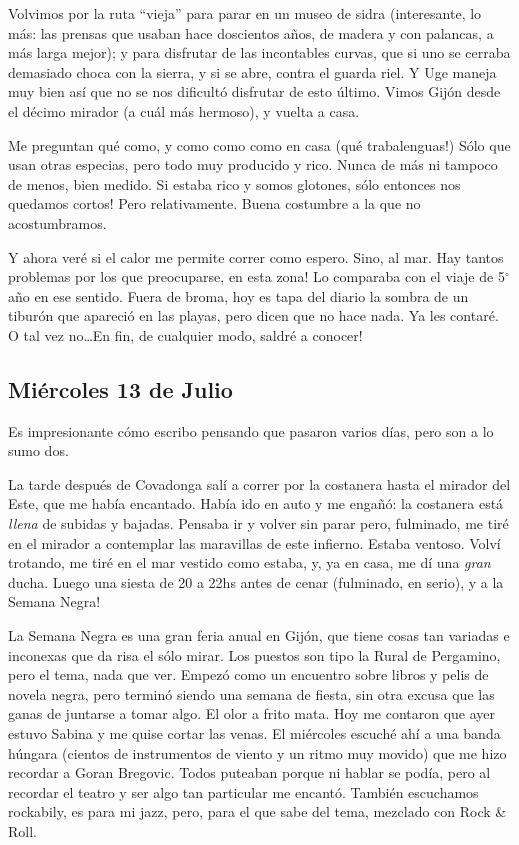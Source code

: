 Volvimos por la ruta ``vieja'' para parar en un museo de sidra (interesante,
lo m\'as: las prensas que usaban hace doscientos a\~nos, de madera y con
palancas, a m\'as larga mejor); y para disfrutar de las incontables curvas, que
si uno se cerraba demasiado choca con la sierra, y si se abre, contra el
guarda riel. Y Uge maneja muy bien as\'i que no se nos dificult\'o disfrutar
de esto \'ultimo. Vimos Gij\'on desde el d\'ecimo mirador (a cu\'al m\'as
hermoso), y vuelta a casa.

Me preguntan qu\'e como, y como como como en casa (\textexclamdown qu\'e
trabalenguas!) S\'olo que usan otras especias, pero todo muy producido y rico.
Nunca de m\'as ni tampoco de menos, bien medido. Si estaba rico y somos
glotones, \textexclamdown s\'olo entonces nos quedamos cortos! Pero
relativamente. Buena costumbre a la que no acostumbramos.

Y ahora ver\'e si el calor me permite correr como espero. Sino, al mar.
\textexclamdown Hay tantos problemas por los que preocuparse, en esta zona! Lo
comparaba con el viaje de 5$^\circ$ a\~no en ese sentido. Fuera de broma, hoy es
tapa del diario la sombra de un tibur\'on que apareci\'o en las playas, pero
dicen que no hace nada. Ya les contar\'e. O tal vez no\ldots En fin,
\textexclamdown de cualquier modo, saldr\'e a conocer!

\subsection*{Mi\'ercoles 13 de Julio}

Es impresionante c\'omo escribo pensando que pasaron varios d\'ias, pero son a
lo sumo dos.

La tarde despu\'es de Covadonga sal\'i a correr por la costanera hasta el
mirador del Este, que me hab\'ia encantado. Hab\'ia ido en auto y me enga\~n\'o:
la costanera est\'a \emph{llena} de subidas y bajadas. Pensaba ir y volver sin
parar pero, fulminado, me tir\'e en el mirador a contemplar las maravillas de
este infierno. Estaba ventoso. Volv\'i trotando, me tir\'e en el mar vestido
como estaba, y, ya en casa, me d\'i una \emph{gran} ducha. Luego una siesta de
20 a 22hs antes de cenar (fulminado, en serio), \textexclamdown y a la Semana
Negra!

La Semana Negra es una gran feria anual en Gij\'on, que tiene cosas tan variadas
e inconexas que da risa el s\'olo mirar. Los puestos son tipo la Rural de
Pergamino, pero el tema, nada que ver. Empez\'o como un encuentro sobre libros y
pelis de novela negra, pero termin\'o siendo una semana de fiesta, sin otra
excusa que las ganas de juntarse a tomar algo. El olor a frito mata. Hoy me
contaron que ayer estuvo Sabina y me quise cortar las venas. El mi\'ercoles
escuch\'e ah\'i a una banda h\'ungara (cientos de instrumentos de viento y un
ritmo muy movido) que me hizo recordar a Goran Bregovic. Todos puteaban porque
ni hablar se pod\'ia, pero al recordar el teatro y ser algo tan particular me
encant\'o. Tambi\'en escuchamos rockabily, es para mi jazz, pero, para el que
sabe del tema, mezclado con Rock \& Roll.

